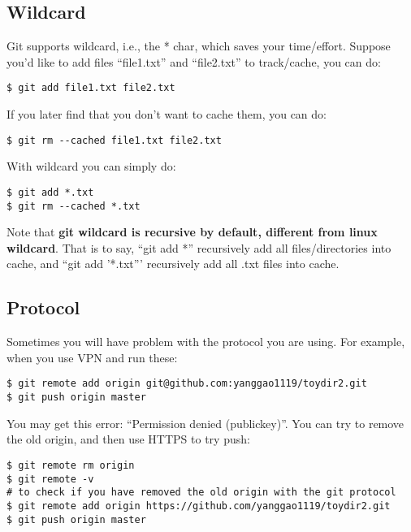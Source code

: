 \documentclass{article} %
\newcommand{\q}[1]{``#1''}
\begin{document}
\subsection{Wildcard}

Git supports wildcard, i.e., the * char, which saves your time/effort. Suppose you'd like to add files \q{file1.txt} and \q{file2.txt} to track/cache, you can do:

\begin{lstlisting}
$ git add file1.txt file2.txt
\end{lstlisting}

If you later find that you don't want to cache them, you can do:

\begin{lstlisting}
$ git rm --cached file1.txt file2.txt
\end{lstlisting}

With wildcard you can simply do:

\begin{lstlisting}
$ git add *.txt
$ git rm --cached *.txt
\end{lstlisting}

Note that \textbf{git wildcard is recursive by default, different from linux wildcard}. That is to say, \q{git add *} recursively add all files/directories into cache, and \q{git add '*.txt'} recursively add all .txt files into cache.

\subsection{Protocol}

Sometimes you will have problem with the protocol you are using. For example, when you use VPN and run these:

\begin{lstlisting}
$ git remote add origin git@github.com:yanggao1119/toydir2.git
$ git push origin master
\end{lstlisting}

You may get this error: \q{Permission denied (publickey)}. You can try to remove the old origin, and then use HTTPS to try push:

\begin{lstlisting}
$ git remote rm origin
$ git remote -v 
# to check if you have removed the old origin with the git protocol
$ git remote add origin https://github.com/yanggao1119/toydir2.git
$ git push origin master  
\end{lstlisting}
\end{document}
